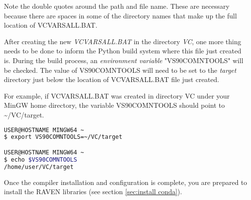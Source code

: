 \begin{enumerate}
		Note the double quotes around the path and file name. These are necessary because
		there are spaces in some of the directory names that make up the full location of
		VCVARSALL.BAT.

		After creating the new {\it VCVARSALL.BAT} in the directory {\it VC}, one more thing
		needs to be done to inform the Python build system where this file just created is.
		During the build process, an {\it environment variable} "VS90COMNTOOLS" will be checked.
		The value of VS90COMNTOOLS will need to be set to the {\it target} directory just below
		the location of VCVARSALL.BAT file just created.

		For example, if VCVARSALL.BAT was created in directory VC under your MinGW home
		directory, the variable VS90COMNTOOLS should point to \textasciitilde /VC/target.

\begin{lstlisting}[language=bash]
USER@HOSTNAME MINGW64 ~
$ export VS90COMNTOOLS=~/VC/target

USER@HOSTNAME MINGW64 ~
$ echo $VS90COMNTOOLS
/home/user/VC/target
\end{lstlisting}

\end{enumerate}



Once the compiler installation and configuration is complete, you are prepared to install the RAVEN libraries
(see section \ref{sec:install conda}).


